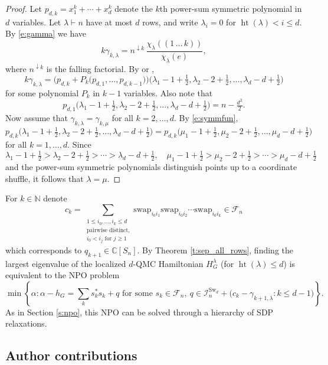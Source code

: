 \documentclass[12pt,dvipsnames,accepted=2016-08-18,a4paper,onecolumn]{quantumarticle}
\DeclareMathOperator{\het}{ht}
\numberwithin{equation}{section}
\newcommand{\N}{\mathbb N}
\newcommand{\CC}{\mathbb C}
\newcommand{\cF}{\mathcal F}
\theoremstyle{definition}
\begin{document}
\begin{proof}
Let $p_{d,k}=x_1^k+\cdots+x_d^k$ denote the $k$th power-sum symmetric polynomial in $d$ variables. 
Let $\lambda\vdash n$ have at most $d$ rows, and write $\lambda_i=0$ for $\het(\lambda)<i\le d$.
By \eqref{e:gamma} we have
$$k \gamma_{k,\lambda}
=n^{\downarrow k}\,
\frac{\chi_\lambda((1\,\dots\,k))}{\chi_\lambda(e)},$$
where $n^{\downarrow k}$ is the falling factorial.
By \cite[Lemma 5.1]{VK} or \cite[Propositions 1.4, 3.3 and 3.4]{IO},
\begin{equation}\label{e:symmfun}
k\gamma_{k,\lambda} = 
\Big(
p_{d,k}+P_k\big(p_{d,1},\dots,p_{d,k-1}\big)
\Big)
\big(
\lambda_1-1+\tfrac12,\lambda_2-2+\tfrac12,\dots,\lambda_d-d+\tfrac12
\big)
\end{equation}
for some polynomial $P_k$ in $k-1$ variables. 
Also note that
$$p_{d,1}\big(
\lambda_1-1+\tfrac12,\lambda_2-2+\tfrac12,\dots,\lambda_d-d+\tfrac12
\big)=n-\tfrac{d^2}{2}.$$
Now assume that $\gamma_{k,\lambda}=\gamma_{k,\mu}$ for all $k=2,\dots,d$. By \eqref{e:symmfun}, 
$$p_{d,k}\big(
\lambda_1-1+\tfrac12,\lambda_2-2+\tfrac12,\dots,\lambda_d-d+\tfrac12
\big)
=p_{d,k}\big(
\mu_1-1+\tfrac12,\mu_2-2+\tfrac12,\dots,\mu_d-d+\tfrac12
\big) \qquad 
$$
for all $k=1,\dots,d$. Since 
$$\lambda_1-1+\tfrac12>\lambda_2-2+\tfrac12>\cdots>\lambda_d-d+\tfrac12,\quad
\mu_1-1+\tfrac12>\mu_2-2+\tfrac12>\cdots>\mu_d-d+\tfrac12
$$
and the power-sum symmetric polynomials distinguish points up to a coordinate shuffle,
it follows that $\lambda=\mu$.
\end{proof}
For $k\in\N$ denote
\begin{equation}\label{e:ck}
c_k=\sum_{\substack{
1\le i_0,\dots,i_k \le d\\[.5mm]
\text{pairwise distinct},\\[.5mm]
i_0<i_j\text{ for }j\ge1
}}
\text{swap}_{i_0i_1}\text{swap}_{i_0i_2}\cdots\text{swap}_{i_0i_k}\in \cF_n
\end{equation}
which corresponds to $q_{k+1}\in\CC[S_n]$.
By Theorem \ref{t:sep_all_rows}, finding the largest eigenvalue of the localized $d$-QMC Hamiltonian $H_G^\lambda$ (for $\het(\lambda)\le d$) is equivalent to the NPO problem
$$
\min\left\{
\alpha:\alpha-h_G=\sum_k s_k^*s_k+q  
\text{ for some } 
s_k\in\cF_n,\ q\in \mathcal{I}^{\text{Sw}_d}_n
+\big(c_k-\gamma_{k+1,\lambda}\colon k\le d-1\big)
\right\}.
$$
As in Section \ref{s:npo}, this NPO can be solved through a hierarchy of SDP relaxations.


\subsection*{Author contributions}
\end{document}
